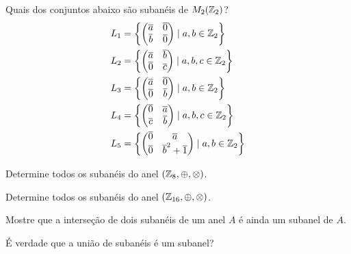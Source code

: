 \documentclass[12pt]{exam}
\begin{document}
\questao{} Quais dos conjuntos abaixo são subanéis de $M_2(\mathbb{Z}_2)$?
\begin{align*}
    L_1 &= \left\{\begin{pmatrix}
        \overline{a} & \overline{0}\\
        \overline{b} & \overline{0}
    \end{pmatrix} \mid a, b \in \mathbb{Z}_2\right\}\\
    L_2 &= \left\{\begin{pmatrix}
        \overline{a} & \overline{b}\\
        \overline{0} & \overline{c}
    \end{pmatrix} \mid a, b, c \in \mathbb{Z}_2\right\}\\
    L_3 &= \left\{\begin{pmatrix}
        \overline{a} & \overline{0}\\
        \overline{0} & \overline{b}
    \end{pmatrix} \mid a, b \in \mathbb{Z}_2\right\}\\
    L_4 &= \left\{\begin{pmatrix}
        \overline{0} & \overline{a}\\
        \overline{c} & \overline{b}
    \end{pmatrix} \mid a, b, c \in \mathbb{Z}_2\right\}\\
    L_5 &= \left\{\begin{pmatrix}
        \overline{0} & \overline{a}\\
        \overline{0} & \overline{b}^2 + \overline{1}
    \end{pmatrix} \mid a, b \in \mathbb{Z}_2\right\}
\end{align*}

\vspace{.3cm}

\questao{} Determine todos os subanéis do anel $(\mathbb{Z}_8, \oplus, \otimes)$.

\vspace{.3cm}

\questao{} Determine todos os subanéis do anel $(\mathbb{Z}_{16}, \oplus, \otimes)$.

\vspace{.3cm}

\questao{} Mostre que a interseção de dois subanéis de um anel $A$ é ainda um subanel de $A$.

\vspace{.3cm}

\questao{} É verdade que a união de subanéis é um subanel?
\end{document}
